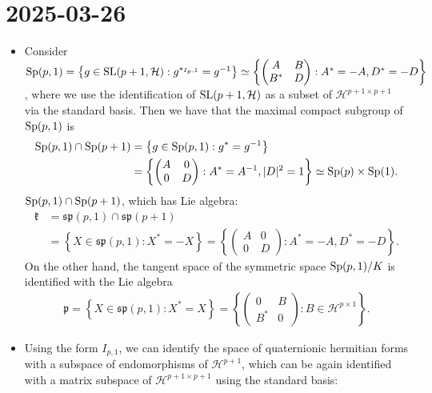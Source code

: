\documentclass{report}
\begin{document}
\section{2025-03-26}
\begin{itemize}
    \item Consider $\operatorname{{\mathrm{Sp}}}(p,1) = \left\{ g \in \operatorname{{\mathrm{SL}}}(p + 1, \mathcal H) : g^{*_{I_p,1}} = g^{-1} \right\} \simeq \left\{ \begin{pmatrix}
    A & B \\
    B^* & D
    \end{pmatrix}: A^* = -A, D^* = -D \right\}$,
    where we use the identification of $\operatorname{{\mathrm{SL}}}(p+1, \mathcal H)$ as a subset of $\mathcal H^{p+1 \times p+1}$ via the standard basis.
    Then we have that the maximal compact subgroup of $\operatorname{{\mathrm{Sp}}}(p,1)$ is 
    \begin{align*}
        \operatorname{{\mathrm{Sp}}}(p,1) \cap \operatorname{{\mathrm{Sp}}}(p+1) &= \left\{ g \in \operatorname{{\mathrm{Sp}}}(p,1) : g^* = g^{-1} \right\}\\
        &= \left\{ \begin{pmatrix}
            A & 0 \\
            0 & D
            \end{pmatrix}: A^* = A^{-1}, |D|^2 = 1 \right\} \simeq \operatorname{{\mathrm{Sp}}}(p) \times \operatorname{{\mathrm{Sp}}}(1).
    \end{align*}
    $\operatorname{{\mathrm{Sp}}}(p,1) \cap \operatorname{{\mathrm{Sp}}}(p+1)$, which has Lie algebra:
    \begin{align*}
        \mathfrak k &= \mathfrak{sp}(p,1) \cap \mathfrak{sp}(p+1)\\
        &= \left\{ X \in \mathfrak{sp}(p,1) : X^* = -X \right\} =
    \left\{
        \begin{pmatrix}
            A & 0 \\
            0 & D
        \end{pmatrix} : A^* = -A, D^* = -D
    \right\}.
    \end{align*}
    On the other hand, the tangent space of the symmetric space $\operatorname{{\mathrm{Sp}}}(p,1)/K$ is identified with the Lie algebra
    \begin{align*}
        \mathfrak p = \left\{ X \in \mathfrak{sp}(p,1) : X^* = X \right\} =
        \left\{
        \begin{pmatrix}
            0 & B \\
            B^* & 0
        \end{pmatrix} : B \in \mathcal H^{p \times 1}
    \right\}.
    \end{align*}
    \item Using the form $I_{p,1}$, we can identify the space of quaternionic hermitian forms with a subspace of endomorphisms of $\mathcal H^{p+1}$, which can be again identified with a matrix subspace of $\mathcal H^{p+1 \times p+1}$ using the standard basis:

\end{itemize}
\end{document}
